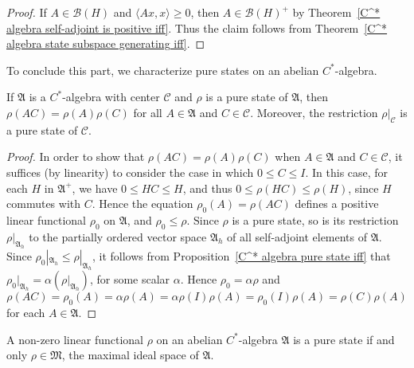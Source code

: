 \begin{proof}
If $A\in\mathcal{B}(H)$ and $\langle Ax,x\rangle\geq 0$, then $A\in\mathcal{B}(H)^+$ by Theorem~\ref{C^* algebra self-adjoint is positive iff}. Thus the claim follows from Theorem~\ref{C^* algebra state subspace generating iff}.
\end{proof}
To conclude this part, we characterize pure states on an abelian $C^*$-algebra.
\begin{proposition}\label{C^* algebra pure state multiplicative for center}
If $\mathfrak{A}$ is a $C^*$-algebra with center $\mathscr{C}$ and $\rho$ is a pure state of $\mathfrak{A}$, then $\rho(AC)=\rho(A)\rho(C)$ for all $A\in\mathfrak{A}$ and $C\in\mathscr{C}$. Moreover, the restriction $\rho|_{\mathscr{C}}$ is a pure state of $\mathscr{C}$.
\end{proposition}
\begin{proof}
In order to show that $\rho(AC)=\rho(A)\rho(C)$ when $A\in\mathfrak{A}$ and $C\in\mathscr{C}$, it suffices (by linearity) to consider the case in which $0\leq C\leq I$. In this case, for each $H$ in $\mathfrak{A}^+$, we have $0\leq HC\leq H$, and thus $0\leq\rho(HC)\leq\rho(H)$, since $H$ commutes with $C$. Hence the equation $\rho_0(A)=\rho(AC)$ defines a positive linear functional $\rho_0$ on $\mathfrak{A}$, and $\rho_0\leq\rho$. Since $\rho$ is a pure state, so is its restriction $\rho|_{\mathfrak{A}_h}$ to the partially ordered vector space $\mathfrak{A}_h$ of all self-adjoint elements of $\mathfrak{A}$. Since $\rho_0|_{\mathfrak{A}_h}\leq\rho|_{\mathfrak{A}_h}$, it follows from Proposition~\ref{C^* algebra pure state iff} that $\rho_0|_{\mathfrak{A}_h}=\alpha(\rho|_{\mathfrak{A}_h})$, for some scalar $\alpha$. Hence $\rho_0=\alpha\rho$ and
\[\rho(AC)=\rho_0(A)=\alpha\rho(A)=\alpha\rho(I)\rho(A)=\rho_0(I)\rho(A)=\rho(C)\rho(A)\]
for each $A\in\mathfrak{A}$.
\end{proof}
\begin{proposition}\label{C^* algebra pure state for abelian}
A non-zero linear functional $\rho$ on an abelian $C^*$-algebra $\mathfrak{A}$ is a pure state if and only $\rho\in\mathfrak{M}$, the maximal ideal space of $\mathfrak{A}$.
\end{proposition}
